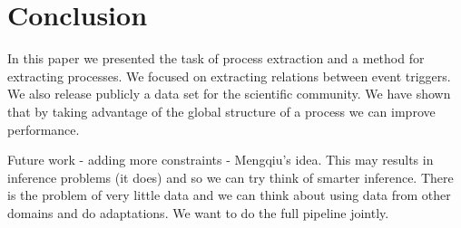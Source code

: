 \section{Conclusion}

In this paper we presented the task of process extraction and a method for extracting processes. We focused on extracting relations between event triggers. We also release publicly a data set for the scientific community. We have shown that by taking advantage of the global structure of a process we can improve performance.

Future work - adding more constraints - Mengqiu's idea. This may results in inference problems (it does) and so we can try think of smarter inference. There is the problem of very little data and we can think about using data from other domains and do adaptations. We want to do the full pipeline jointly.
